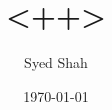 \documentclass[14pt]{extarticle}
\begin{document}
\title{<++>}
\author{Syed Shah}
\date{\today}
\maketitle

\centering
\fbox{
  \texttt{[image: <++>]}
}
\end{document}
